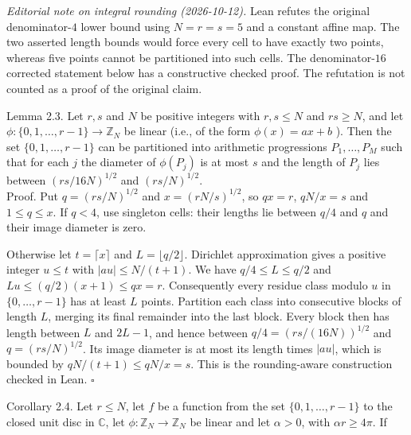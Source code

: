 \documentclass[10pt]{article}
\begin{document}
\emph{Editorial note on integral rounding (2026-10-12).}
Lean refutes the original denominator-$4$ lower bound using
$N=r=s=5$ and a constant affine map. The two asserted length bounds would
force every cell to have exactly two points, whereas five points cannot
be partitioned into such cells. The denominator-$16$ corrected statement
below has a constructive checked proof. The refutation is not counted
as a proof of the original claim.

Lemma 2.3. Let $r, s$ and $N$ be positive integers with $r, s \leqslant N$ and $r s \geqslant N$, and let $\phi:\{0,1, \ldots, r-1\} \rightarrow \mathbb{Z}_{N}$ be linear (i.e., of the form $\phi(x)=a x+b$ ). Then the set $\{0,1, \ldots, r-1\}$ can be partitioned into arithmetic progressions $P_{1}, \ldots, P_{M}$ such that for each $j$ the diameter of $\phi\left(P_{j}\right)$ is at most $s$ and the length of $P_{j}$ lies between $(r s / 16 N)^{1 / 2}$ and $(r s / N)^{1 / 2}$.\\
Proof. Put $q=(rs/N)^{1/2}$ and $x=(rN/s)^{1/2}$, so $qx=r$,
$qN/x=s$ and $1\leqslant q\leqslant x$. If $q<4$, use singleton cells:
their lengths lie between $q/4$ and $q$ and their image diameter is zero.

Otherwise let $t=\lceil x\rceil$ and $L=\lfloor q/2\rfloor$. Dirichlet
approximation gives a positive integer $u\leqslant t$ with
$|au|\leqslant N/(t+1)$. We have $q/4\leqslant L\leqslant q/2$ and
$Lu\leqslant(q/2)(x+1)\leqslant qx=r$. Consequently every residue class
modulo $u$ in $\{0,\ldots,r-1\}$ has at least $L$ points. Partition each
class into consecutive blocks of length $L$, merging its final remainder
into the last block. Every block then has length between $L$ and $2L-1$,
and hence between $q/4=(rs/(16N))^{1/2}$ and $q=(rs/N)^{1/2}$.
Its image diameter is at most its length times $|au|$, which is bounded by
$qN/(t+1)\leqslant qN/x=s$. This is the rounding-aware construction
checked in Lean. \(\square\)

Corollary 2.4. Let $r\leqslant N$, let $f$ be a function from the set $\{0,1, \ldots, r-1\}$ to the closed unit disc in $\mathbb{C}$, let $\phi: \mathbb{Z}_{N} \rightarrow \mathbb{Z}_{N}$ be linear and let $\alpha>0$, with $\alpha r\geqslant4\pi$. If
\end{document}
